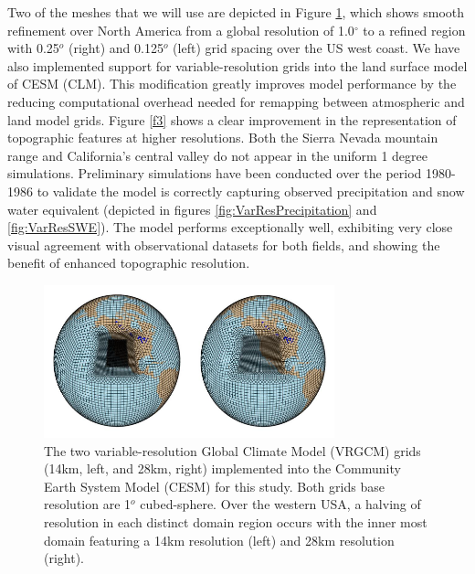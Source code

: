 \documentclass[11pt]{article}
\begin{document}
Two of the meshes that we will use are depicted in Figure \ref{fig:CESMVarResMeshes}, which shows smooth refinement over North America from a global resolution of 1.0$^\circ$ to a refined region with 0.25$^{o}$ (right) and 0.125$^{o}$ (left) grid spacing over the US west coast.  We have also implemented support for variable-resolution grids into the land surface model of CESM (CLM).  This modification greatly improves model performance by the reducing computational overhead needed for remapping between atmospheric and land model grids.  Figure \ref{f3} shows a clear improvement in the representation of topographic features at higher resolutions.  Both the Sierra Nevada mountain range and California's central valley do not appear in the uniform 1 degree simulations.  Preliminary simulations have been conducted over the period 1980-1986 to validate the model is correctly capturing observed precipitation and snow water equivalent (depicted in figures \ref{fig:VarResPrecipitation} and \ref{fig:VarResSWE}).  The model performs exceptionally well, exhibiting very close visual agreement with observational datasets for both fields, and showing the benefit of enhanced topographic resolution.



\begin{figure}
  \begin{center}
  \includegraphics[width=0.75\textwidth]{14kmand28kmgrids}
  \caption{The two variable-resolution Global Climate Model (VRGCM) grids (14km, left, and 28km, right) implemented into the Community Earth System Model (CESM) for this study.  Both grids base resolution are 1$^{o}$ cubed-sphere.  Over the western USA, a halving of resolution in each distinct domain region occurs with the inner most domain featuring a 14km resolution (left) and 28km resolution (right).} \label{fig:CESMVarResMeshes}
  \end{center}
\end{figure}
\end{document}

